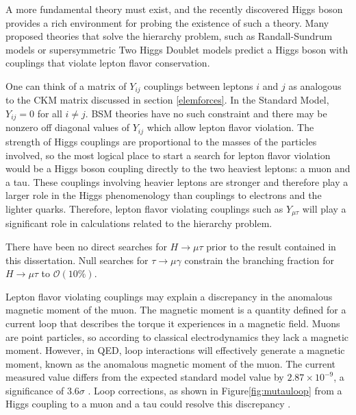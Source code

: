 \documentclass[oneside, letterpaper, oldfontcommands]{memoir}
\begin{document}
\qquad A more fundamental theory must exist, and the recently discovered Higgs boson provides a rich environment for probing the existence of such a theory. Many proposed theories that solve the hierarchy problem, such as Randall-Sundrum models \cite{Randall:1999ee} or supersymmetric Two Higgs Doublet models \cite{Branco:2011iw} 
predict a Higgs boson with couplings that violate lepton flavor conservation. 

\qquad One can think of a matrix of $Y_{ij}$ couplings between leptons $i$ and $j$ as analogous to the CKM matrix discussed in section \ref{elemforces}. In the Standard Model, $Y_{ij}= 0$ for all $i \neq j$. BSM theories have no such constraint and there may be nonzero off diagonal values of $Y_{ij}$ which allow lepton flavor violation. The strength of Higgs couplings are proportional to the masses of the particles involved, so the most logical place to start a search for lepton flavor violation would be a Higgs boson coupling directly to the two heaviest leptons: a muon and a tau. These couplings involving heavier leptons are stronger and therefore play a larger role in the Higgs phenomenology than couplings to electrons and the lighter quarks. Therefore, lepton flavor violating couplings such as  $Y_{\mu\tau}$ will play a significant role in calculations related to the hierarchy problem. 

\qquad There have been no direct searches for $H \rightarrow \mu\tau$ prior to the result contained in this dissertation. Null searches for $\tau \rightarrow \mu\gamma$ constrain the branching fraction for $H \rightarrow \mu\tau$ to $\mathcal{O}(10\%)$.\cite{Harnik:2012pb}

\qquad Lepton flavor violating couplings may explain a discrepancy in the anomalous magnetic moment of the muon. The magnetic moment is a quantity defined for a current loop that describes the torque it experiences in a magnetic field. Muons are point particles, so according to classical electrodynamics they lack a magnetic moment. However, in QED, loop interactions will effectively generate a magnetic moment, known as the anomalous magnetic moment of the muon. The current measured value differs from the expected standard model value by $2.87 \times 10^{-9}$, a significance of $3.6 \sigma$ \cite{Bennett:2004pv}\cite{Agashe:2014kda}. Loop corrections, as shown in Figure\ref{fig:mutauloop} from a Higgs coupling to a muon and a tau could resolve this discrepancy \cite{Harnik:2012pb}. 
\end{document}
